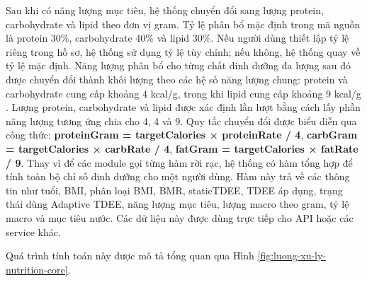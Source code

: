 \documentclass[12pt, a4paper]{report}
\begin{document}
Sau khi có năng lượng mục tiêu, hệ thống chuyển đổi sang lượng protein, carbohydrate và lipid theo đơn vị gram. Tỷ lệ phân bổ mặc định trong mã nguồn là protein 30\%, carbohydrate 40\% và lipid 30\%. Nếu người dùng thiết lập tỷ lệ riêng trong hồ sơ, hệ thống sử dụng tỷ lệ tùy chỉnh; nếu không, hệ thống quay về tỷ lệ mặc định. Năng lượng phân bổ cho từng chất dinh dưỡng đa lượng sau đó được chuyển đổi thành khối lượng theo các hệ số năng lượng chung: protein và carbohydrate cung cấp khoảng 4 kcal/g, trong khi lipid cung cấp khoảng 9 kcal/g \cite{vien_dinh_duong_2007, fao_2003}. Lượng protein, carbohydrate và lipid được xác định lần lượt bằng cách lấy phần năng lượng tương ứng chia cho 4, 4 và 9. Quy tắc chuyển đổi được biểu diễn qua công thức: \textbf{proteinGram = targetCalories × proteinRate / 4}, \textbf{carbGram = targetCalories × carbRate / 4}, \textbf{fatGram = targetCalories × fatRate / 9}.
Thay vì để các module gọi từng hàm rời rạc, hệ thống có hàm tổng hợp để tính toàn bộ chỉ số dinh dưỡng cho một người dùng. Hàm này trả về các thông tin như tuổi, BMI, phân loại BMI, BMR, staticTDEE, TDEE áp dụng, trạng thái dùng Adaptive TDEE, năng lượng mục tiêu, lượng macro theo gram, tỷ lệ macro và mục tiêu nước. Các dữ liệu này được dùng trực tiếp cho API hoặc các service khác.

Quá trình tính toán này được mô tả tổng quan qua Hình \ref{fig:luong-xu-ly-nutrition-core}.
\end{document}
